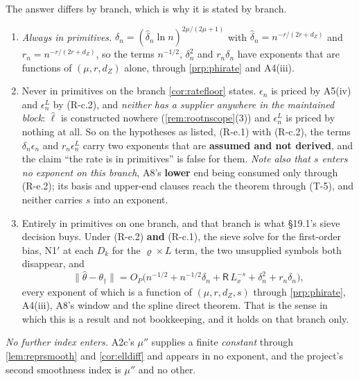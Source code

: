 \begin{remark}\label{rem:ratefloorprim}
The answer differs by branch, which is why it is stated by branch.
\begin{enumerate}
\item[(a)] \emph{Always in primitives.} $\delta_n=(\hat\delta_n\ln n)^{2\mu/(2\mu+1)}$ with
$\hat\delta_n=n^{-r/(2r+d_Z)}$ and $r_n=n^{-r/(2r+d_Z)}$, so the terms $n^{-1/2}$, $\delta_n^{2}$ and
$r_n\delta_n$ have exponents that are functions of $(\mu,r,d_Z)$ alone, through \cref{prp:phirate} and
A4(iii).
\item[(b)] Never in primitives on the branch \cref{cor:ratefloor} states. $\epsilon_n$ is priced
by A5(iv) and $\epsilon^{L}_n$ by (R-c.2), and \emph{neither has a supplier anywhere in the maintained
block}: $\hat\ell$ is constructed nowhere (\cref{rem:rootnscope}\textup{(3)}) and $\epsilon^{L}_n$ is
priced by nothing at all. So on the hypotheses as listed, (R-e.1) with (R-c.2), the terms
$\delta_n\epsilon_n$ and $r_n\epsilon^{L}_n$ carry two exponents that are \textbf{assumed and not
derived}, and the claim ``the rate is in primitives'' is false for them. \emph{Note also that $s$ enters
no exponent on this branch}, A8's \textbf{lower} end being consumed only through (R-e.2); its basis
and upper-end clauses reach the theorem through (T-5), and neither carries $s$ into an exponent.
\item[(c)] Entirely in primitives on one branch, and that branch is what \S19.1's sieve decision
buys. Under (R-e.2) \textbf{and} (R-c.1), the sieve solve for the first-order bias, N1$'$ at each
$D_k$ for the $\varrho\times L$ term, the two unsupplied symbols both disappear, and
\[
\big\|\hat\theta-\theta_\dagger\big\|
=O_P\Big(n^{-1/2}+n^{-1/2}\delta_n+\mathsf R\,L_x^{-s}+\delta_n^{2}+r_n\delta_n\Big),
\]
every exponent of which is a function of $(\mu,r,d_Z,s)$ through \cref{prp:phirate}, A4(iii), A8's window
and the spline direct theorem. That is the sense in which this is a result and not bookkeeping, and
it holds on that branch only.
\end{enumerate}
\emph{No further index enters.} A2c's $\mu''$ supplies a finite \emph{constant} through
\cref{lem:reprsmooth} and \cref{cor:elldiff} and appears in no exponent, and the project's second
smoothness index is $\mu''$ and no other.
\end{remark}

